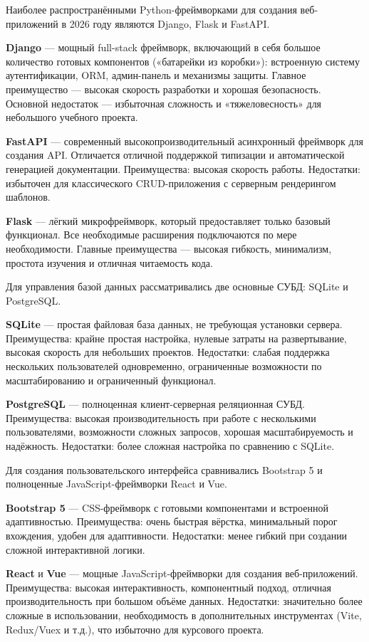 Наиболее распространёнными Python-фреймворками для создания веб-приложений в 2026 году являются Django\cite{django}, Flask\cite{flask} и FastAPI\cite{fastapi}.

\textbf{Django} — мощный full-stack фреймворк, включающий в себя большое количество готовых компонентов («батарейки из коробки»): встроенную систему аутентификации, ORM, админ-панель и механизмы защиты. Главное преимущество — высокая скорость разработки и хорошая безопасность. Основной недостаток — избыточная сложность и «тяжеловесность» для небольшого учебного проекта.

\textbf{FastAPI} — современный высокопроизводительный асинхронный фреймворк для создания API. Отличается отличной поддержкой типизации и автоматической генерацией документации. Преимущества: высокая скорость работы. Недостатки: избыточен для классического CRUD-приложения с серверным рендерингом шаблонов.

\textbf{Flask} — лёгкий микрофреймворк, который предоставляет только базовый функционал. Все необходимые расширения подключаются по мере необходимости. Главные преимущества — высокая гибкость, минимализм, простота изучения и отличная читаемость кода.

Для управления базой данных рассматривались две основные СУБД: SQLite и PostgreSQL.

\textbf{SQLite} — простая файловая база данных, не требующая установки сервера. Преимущества: крайне простая настройка, нулевые затраты на развертывание, высокая скорость для небольших проектов. Недостатки: слабая поддержка нескольких пользователей одновременно, ограниченные возможности по масштабированию и ограниченный функционал.

\textbf{PostgreSQL} — полноценная клиент-серверная реляционная СУБД. Преимущества: высокая производительность при работе с несколькими пользователями, возможности сложных запросов, хорошая масштабируемость и надёжность. Недостатки: более сложная настройка по сравнению с SQLite.

Для создания пользовательского интерфейса сравнивались Bootstrap 5\cite{bootstrap} и полноценные JavaScript-фреймворки React\cite{react} и Vue.

\textbf{Bootstrap 5} — CSS-фреймворк с готовыми компонентами и встроенной адаптивностью. Преимущества: очень быстрая вёрстка, минимальный порог вхождения, удобен для адаптивности. Недостатки: менее гибкий при создании сложной интерактивной логики.

\textbf{React} и \textbf{Vue} — мощные JavaScript-фреймворки для создания веб-приложений. Преимущества: высокая интерактивность, компонентный подход, отличная производительность при большом объёме данных. Недостатки: значительно более сложные в использовании, необходимость в дополнительных инструментах (Vite, Redux/Vuex и т.д.), что избыточно для курсового проекта.


